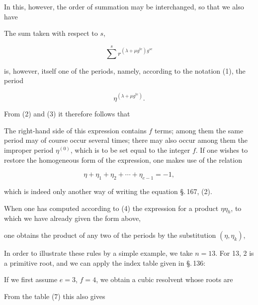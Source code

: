 In this, however, the order of summation may be interchanged,
so that we also have


The sum taken with respect to $s$,

\[
\sum^{s} r^{(\lambda + \mu g^{te})g^{se}}
\]

is, however, itself one of the periods, namely, according to the notation (1), the period

\[
\eta^{(\lambda + \mu g^{te})}.
\]

From (2) and (3) it therefore follows that


The right-hand side of this expression contains $f$ terms; among them the same period may of course occur several times;
there may also occur among them the improper period $\eta^{(0)}$,
which is to be set equal to the integer $f$. If one wishes to restore the homogeneous form of the expression, one makes use of
the relation

\[
\eta + \eta_1 + \eta_2 + \cdots + \eta_{e-1} = -1,
\]

which is indeed only another way of writing the equation \S.\,167, (2).

When one has computed according to (4) the expression for a product $\eta\eta_h$,
to which we have already given the form above,


one obtains the product of any two of the periods
by the substitution $(\eta, \eta_k)$,


In order to illustrate these rules by a simple example,
we take $n = 13$. For 13, 2 is a primitive root, and
we can apply the index table given in \S.\,136:


If we first assume $e = 3$, $f = 4$, we obtain
a cubic resolvent whose roots are


From the table (7) this also gives
